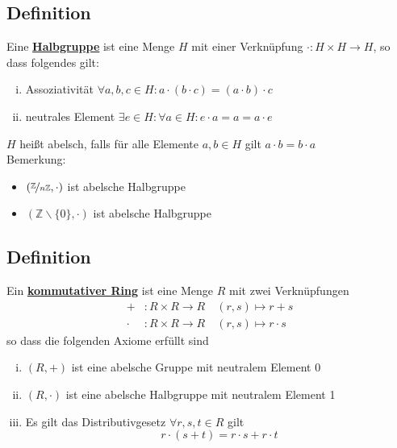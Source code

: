 \subsection{Definition} %
\label{sub:definition}
Eine \underline{\textbf{Halbgruppe}} ist eine Menge $H$ mit einer Verknüpfung $\cdot : H \times H \to H$, so dass folgendes gilt:
\begin{enumerate}[(i)]
	\item Assoziativität $\forall a,b,c \in H : a \cdot (b \cdot c)= (a \cdot b) \cdot c$
	\item neutrales Element $\exists e \in H : \forall a \in H : e \cdot a = a = a \cdot e$
\end{enumerate}
$H$ heißt abelsch, falls für alle Elemente $a,b \in H$ gilt $a \cdot b = b \cdot a$
\vspace{\baselineskip} \\
Bemerkung:
\begin{itemize}
	\item $(\nicefrac{\mathds{Z}}{n \mathds{Z}} , \cdot )$ ist abelsche Halbgruppe
	\item $(\mathds{Z} \backslash \{0\}, \cdot )$ ist abelsche Halbgruppe
\end{itemize}

\subsection{Definition} %
\label{sub:definition}
Ein \underline{ \textbf{kommutativer Ring}} ist eine Menge $R$ mit zwei Verknüpfungen
\begin{align*}
	+ &: R \times R \to R \quad (r,s) \mapsto r+s \\
	\cdot &: R \times R \to R \quad (r,s) \mapsto r \cdot s
\end{align*}
so dass die folgenden Axiome erfüllt sind
\begin{enumerate}[(i)]
	\item $(R,+)$ ist eine abelsche Gruppe mit neutralem Element $0$
	\item $(R, \cdot )$ ist eine abelsche Halbgruppe mit neutralem Element 1
	\item Es gilt das Distributivgesetz $\forall r,s,t \in R$ gilt
	\[
		r \cdot (s +t) = r \cdot s + r \cdot t
	\]
\end{enumerate}

